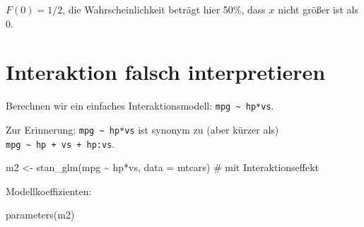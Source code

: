 \documentclass[
  a4paper,
  DIV=11]{scrreprt}
\newenvironment{Shaded}{\begin{snugshade}}{\end{snugshade}}
\newcommand{\AttributeTok}[1]{\textcolor[rgb]{0.40,0.45,0.13}{#1}}
\newcommand{\CommentTok}[1]{\textcolor[rgb]{0.37,0.37,0.37}{#1}}
\newcommand{\FunctionTok}[1]{\textcolor[rgb]{0.28,0.35,0.67}{#1}}
\newcommand{\NormalTok}[1]{\textcolor[rgb]{0.00,0.23,0.31}{#1}}
\newcommand{\OtherTok}[1]{\textcolor[rgb]{0.00,0.23,0.31}{#1}}
\newcommand{\SpecialCharTok}[1]{\textcolor[rgb]{0.37,0.37,0.37}{#1}}
\theoremstyle{definition}
\theoremstyle{remark}
\begin{document}
\(F(0)=1/2\), die Wahrscheinlichkeit beträgt hier 50\%, dass \(x\) nicht
größer ist als 0.

\hypertarget{interaktion-falsch-interpretieren}{%
\section{Interaktion falsch interpretieren
🤷}\label{interaktion-falsch-interpretieren}}

Berechnen wir ein einfaches Interaktionsmodell:
\texttt{mpg\ \textasciitilde{}\ hp*vs}.

\begin{tcolorbox}[enhanced jigsaw, colframe=quarto-callout-note-color-frame, title=\textcolor{quarto-callout-note-color}{\faInfo}\hspace{0.5em}{Hinweis}, breakable, leftrule=.75mm, coltitle=black, toptitle=1mm, bottomrule=.15mm, bottomtitle=1mm, opacityback=0, arc=.35mm, rightrule=.15mm, left=2mm, colbacktitle=quarto-callout-note-color!10!white, opacitybacktitle=0.6, toprule=.15mm, titlerule=0mm, colback=white]
Zur Erinnerung: \texttt{mpg\ \textasciitilde{}\ hp*vs} ist synonym zu
(aber kürzer als) \texttt{mpg\ \textasciitilde{}\ hp\ +\ vs\ +\ hp:vs}.
\end{tcolorbox}

\begin{Shaded}
\begin{Highlighting}[]
\NormalTok{m2 }\OtherTok{\textless{}{-}} \FunctionTok{stan\_glm}\NormalTok{(mpg }\SpecialCharTok{\textasciitilde{}}\NormalTok{ hp}\SpecialCharTok{*}\NormalTok{vs, }\AttributeTok{data =}\NormalTok{ mtcars)  }\CommentTok{\# mit Interaktionseffekt}
\end{Highlighting}
\end{Shaded}

Modellkoeffizienten:

\begin{Shaded}
\begin{Highlighting}[]
\FunctionTok{parameters}\NormalTok{(m2)}
\end{Highlighting}
\end{Shaded}
\end{document}
